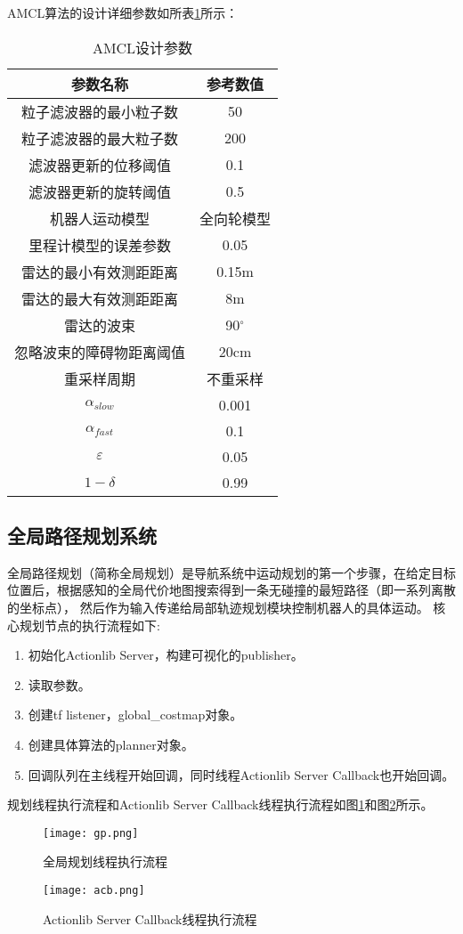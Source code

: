 \documentclass[lang=cn,11pt,a4paper]{elegantpaper}
\begin{document}
AMCL算法的设计详细参数如所表\ref{tab:amcl}所示：
\begin{table}[!htbp]
  \centering
  \caption{AMCL设计参数}\label{tab:amcl}
  \begin{tabular}{cc}
    \toprule
    参数名称  & 参考数值  \\
    \midrule
    粒子滤波器的最小粒子数  & 50                \\
    粒子滤波器的最大粒子数  & 200               \\
    滤波器更新的位移阈值   & 0.1               \\
    滤波器更新的旋转阈值   & 0.5               \\
    机器人运动模型      & 全向轮模型 \\
    里程计模型的误差参数   & 0.05              \\
    雷达的最小有效测距距离  & 0.15m             \\
    雷达的最大有效测距距离  & 8m                \\
    雷达的波束        & 90$^{\circ}$              \\
    忽略波束的障碍物距离阈值 & 20cm              \\
    重采样周期        & 不重采样             \\
    $\alpha_{slow}$ & 0.001\\
    $\alpha_{fast}$ & 0.1\\
    $\varepsilon $  & 0.05\\
    $1-\delta  $  & 0.99\\
  \bottomrule
  \end{tabular}%
\end{table}%

\subsection{全局路径规划系统}

全局路径规划（简称全局规划）是导航系统中运动规划的第一个步骤，在给定目标位置后，根据感知的全局代价地图搜索得到一条无碰撞的最短路径（即一系列离散的坐标点），
然后作为输入传递给局部轨迹规划模块控制机器人的具体运动。
核心规划节点的执行流程如下:
\begin{enumerate}
  \item 初始化Actionlib Server，构建可视化的publisher。
  \item 读取参数。
  \item 创建tf listener，global\_costmap对象。
  \item 创建具体算法的planner对象。
  \item 回调队列在主线程开始回调，同时线程Actionlib Server Callback也开始回调。
\end{enumerate}
规划线程执行流程和Actionlib Server Callback线程执行流程如图\ref{fig:gp}和图\ref{fig:acb}所示。
\begin{figure}[htbp]
  \centering
  \texttt{[image: gp.png]}
  \caption{全局规划线程执行流程}
  \label{fig:gp}
\end{figure}
\begin{figure}[htbp]
  \centering
  \texttt{[image: acb.png]}
  \caption{Actionlib Server Callback线程执行流程}
  \label{fig:acb}
\end{figure}
\end{document}
